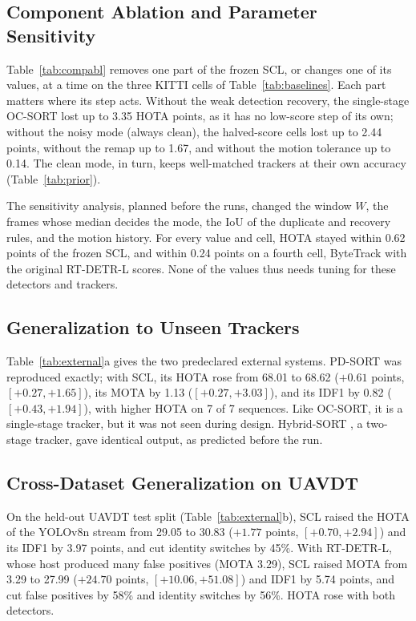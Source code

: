 \documentclass[pdflatex,sn-mathphys-num,iicol]{sn-jnl}
\newcommand{\scl}{SCL}
\begin{document}
\subsection{Component Ablation and Parameter Sensitivity}\label{sec:ablation}
Table~\ref{tab:compabl} removes one part of the frozen \scl{}, or changes one of its values, at a
time on the three KITTI cells of Table~\ref{tab:baselines}. Each part matters where its step acts.
Without the weak detection recovery, the single-stage OC-SORT lost up to 3.35 HOTA points, as it has
no low-score step of its own; without the noisy mode (always clean), the halved-score cells lost up
to 2.44 points, without the remap up to 1.67, and without the motion tolerance up to 0.14. The clean
mode, in turn, keeps well-matched trackers at their own accuracy (Table~\ref{tab:prior}).

The sensitivity analysis, planned before the runs, changed the window $W$, the frames whose median
decides the mode, the IoU of the duplicate and recovery rules, and the motion history. For every
value and cell, HOTA stayed within 0.62 points of the frozen \scl{}, and within 0.24 points on a
fourth cell, ByteTrack with the original RT-DETR-L scores. None of the values thus needs tuning for
these detectors and trackers.

\subsection{Generalization to Unseen Trackers}\label{sec:external}
Table~\ref{tab:external}a gives the two predeclared external systems. PD-SORT \cite{wang2025pdsort}
was reproduced exactly; with \scl{}, its HOTA rose from 68.01 to 68.62 ($+0.61$ points,
$[+0.27,+1.65]$), its MOTA by 1.13 ($[+0.27,+3.03]$), and its IDF1 by 0.82 ($[+0.43,+1.94]$), with
higher HOTA on 7 of 7 sequences. Like OC-SORT, it is a single-stage tracker, but it was not seen
during design. Hybrid-SORT \cite{yang2024hybridsort}, a two-stage tracker, gave identical output, as
predicted before the run.

\subsection{Cross-Dataset Generalization on UAVDT}\label{sec:visdrone}
On the held-out UAVDT test split (Table~\ref{tab:external}b), \scl{} raised the HOTA of the YOLOv8n
stream from 29.05 to 30.83 ($+1.77$ points, $[+0.70,+2.94]$) and its IDF1 by 3.97 points, and cut
identity switches by 45\%. With RT-DETR-L, whose host produced many false positives (MOTA 3.29),
\scl{} raised MOTA from 3.29 to 27.99 ($+24.70$ points, $[+10.06,+51.08]$) and IDF1 by 5.74 points,
and cut false positives by 58\% and identity switches by 56\%. HOTA rose with both detectors.
\end{document}
